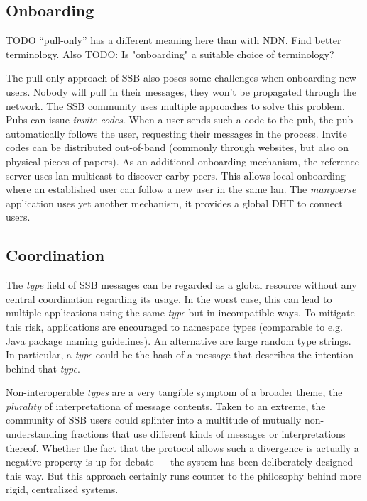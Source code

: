 \documentclass[10pt,sigconf]{acmart}
\begin{document}
\subsection{Onboarding}

TODO ``pull-only'' has a different meaning here than with NDN. Find better terminology. Also TODO: Is "onboarding" a suitable choice of terminology?

The pull-only approach of SSB also poses some challenges when onboarding new users. Nobody will pull in their messages, they won't be propagated through the network. The SSB community uses multiple approaches to solve this problem. Pubs can issue \textit{invite codes}. When a user sends such a code to the pub, the pub automatically follows the user, requesting their messages in the process. Invite codes can be distributed out-of-band (commonly through websites, but also on physical pieces of papers). As an additional onboarding mechanism, the reference server uses lan multicast to discover earby peers. This allows local onboarding where an established user can follow a new user in the same lan. The \textit{manyverse} application uses yet another mechanism, it provides a global DHT to connect users.

\subsection{Coordination}

The \textit{type} field of SSB messages can be regarded as a global resource without any central coordination regarding its usage. In the worst case, this can lead to multiple applications using the same \textit{type} but in incompatible ways. To mitigate this risk, applications are encouraged to namespace types (comparable to e.g. Java package naming guidelines). An alternative are large random type strings. In particular, a \textit{type} could be the hash of a message that describes the intention behind that \textit{type}.

Non-interoperable \textit{types} are a very tangible symptom of a broader theme, the \textit{plurality} of interpretationa of message contents. Taken to an extreme, the community of SSB users could splinter into a multitude of mutually non-understanding fractions that use different kinds of messages or interpretations thereof. Whether the fact that the protocol allows such a divergence is actually a negative property is up for debate --- the system has been deliberately designed this way. But this approach certainly runs counter to the philosophy behind more rigid, centralized systems.
\end{document}
